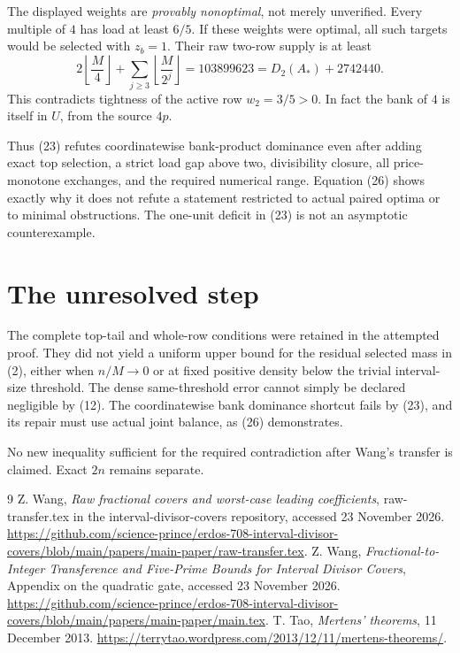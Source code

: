 \documentclass[11pt,a4paper]{article}
\begin{document}
The displayed weights are \emph{provably nonoptimal}, not merely
unverified. Every multiple of \(4\) has load at least \(6/5\).
If these weights were optimal, all such targets would be selected
with \(z_b=1\). Their raw two-row supply is at least
\[
 2\left\lfloor\frac M4\right\rfloor+
 \sum_{j\ge3}\left\lfloor\frac M{2^j}\right\rfloor
 =103899623
 =D_2(A_*)+2742440.
 \tag{26}
\]
This contradicts tightness of the active row \(w_2=3/5>0\).
In fact the bank of \(4\) is itself in \(U\), from the source \(4p\).

Thus (23) refutes coordinatewise bank-product dominance even after
adding exact top selection, a strict load gap above two, divisibility
closure, all price-monotone exchanges, and the required numerical
range. Equation (26) shows exactly why it does not refute a statement
restricted to actual paired optima or to minimal obstructions.
The one-unit deficit in (23) is not an asymptotic counterexample.

\section{The unresolved step}
The complete top-tail and whole-row conditions were retained in
the attempted proof. They did not yield a uniform upper bound for
the residual selected mass in (2), either when \(n/M\to0\) or at
fixed positive density below the trivial interval-size threshold.
The dense same-threshold error cannot simply be declared negligible
by (12). The coordinatewise bank dominance shortcut fails by (23),
and its repair must use actual joint balance, as (26) demonstrates.

No new inequality sufficient for the required contradiction after
Wang's transfer is claimed. Exact \(2n\) remains separate.

\begin{thebibliography}{9}
 Z. Wang, \emph{Raw fractional covers and worst-case
leading coefficients}, raw-transfer.tex in the interval-divisor-covers
repository, accessed 23 November 2026.
\url{https://github.com/science-prince/erdos-708-interval-divisor-covers/blob/main/papers/main-paper/raw-transfer.tex}.
 Z. Wang, \emph{Fractional-to-Integer Transference and
Five-Prime Bounds for Interval Divisor Covers}, Appendix on the
quadratic gate, accessed 23 November 2026.
\url{https://github.com/science-prince/erdos-708-interval-divisor-covers/blob/main/papers/main-paper/main.tex}.
 T. Tao, \emph{Mertens' theorems}, 11 December 2013.
\url{https://terrytao.wordpress.com/2013/12/11/mertens-theorems/}.
\end{thebibliography}
\end{document}
